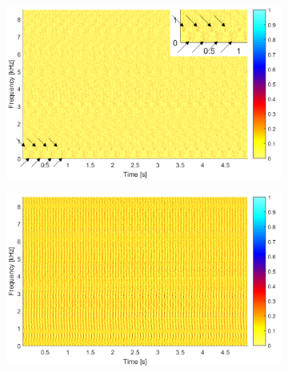 \begin{figure}[!ht]
    \centering
    \begin{subfigure}[b]{0.49\textwidth}
        \centering
        \captionsetup{skip=0.01pt}
        \caption{}
        \includegraphics[width=\textwidth]{wykresy/chapter_application/semi_blind/wagiL212_4.png}
        \label{fig:chapter7/semi_blind/wagi_L212_4}
    \end{subfigure}
     \vspace{-1\baselineskip}
    \begin{subfigure}[b]{0.49\textwidth}
        \centering
        \captionsetup{skip=0.01pt}
        \caption{}
        \includegraphics[width=\textwidth]{wykresy/chapter_application/semi_blind/wagiL212_16.png}
        \label{fig:chapter7/semi_blind/wagi_L212_16}
    \end{subfigure}
     \vspace{-1\baselineskip}
    \begin{subfigure}[b]{0.49\textwidth}

\end{subfigure}
\end{figure}
